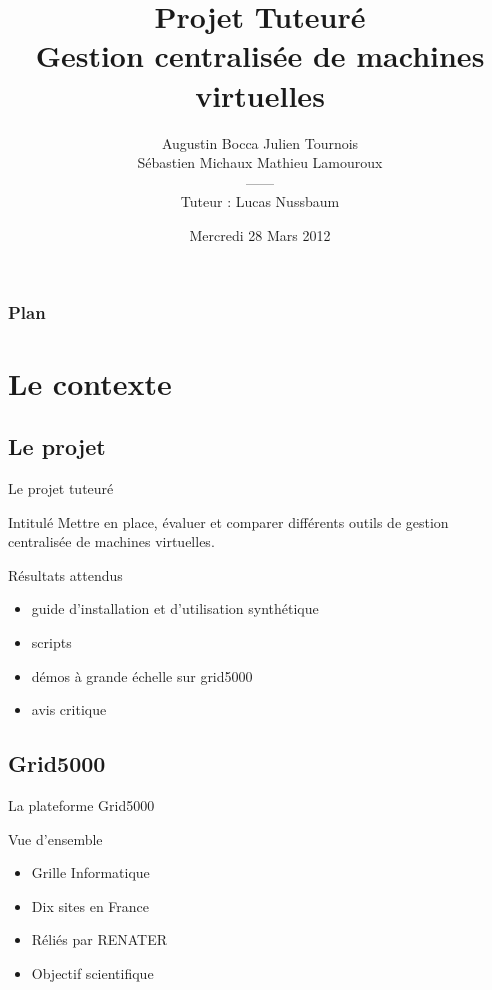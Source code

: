 \documentclass{beamer}
\title{Projet Tuteuré \\Gestion centralisée de machines virtuelles}
\author{Augustin Bocca Julien Tournois\\Sébastien Michaux Mathieu Lamouroux\\------ \\Tuteur : Lucas Nussbaum}
\institute{IUT de Nancy Charlemagne\\Licence Professionnelle ASRALL}
\date{Mercredi 28 Mars 2012}
\begin{document}

\begin{frame}
  \titlepage
\end{frame}

\begin{frame}
    \frametitle{Plan}
    \tableofcontents
\end{frame}

\section{Le contexte}
\subsection{Le projet}
\begin{frame}{Le projet tuteuré}
\begin{block}{Intitulé}
Mettre en place, évaluer et comparer différents outils de gestion centralisée de machines virtuelles.
\end{block}
\pause
\begin{block}{Résultats attendus}
  \begin{itemize}
    \item guide d'installation et d'utilisation synthétique
\pause
    \item scripts
\pause
    \item démos à grande échelle sur grid5000
\pause
    \item avis critique
   \end{itemize}
\end{block}
\end{frame}

\subsection{Grid5000}
\begin{frame}{La plateforme Grid5000}
\begin{block}{Vue d'ensemble}
  \begin{itemize}
    \item Grille Informatique
\pause
    \item Dix sites en France
\pause
    \item Réliés par RENATER
\pause
    \item Objectif scientifique
  \end{itemize}
\end{block}
\end{frame}
\end{document}
